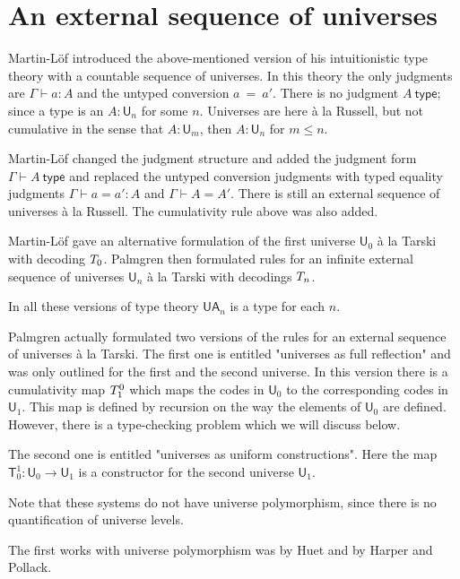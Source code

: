 \documentclass[10pt,a4paper]{article}
\newcommand{\conv}{=}
\def\UU{\mathsf{U}}
\newcommand{\type}{\mathsf{type}}
\newcommand{\T}{\mathsf{T}}
\newcommand{\UA}{\mathsf{UA}}
\begin{document}
\section{An external sequence of universes}

Martin-Löf \cite{martinlof:predicative} introduced the above-mentioned version of his intuitionistic type theory with a countable sequence of universes. In this theory the only judgments are $\Gamma \vdash a : A$ and the untyped conversion $a\ \conv\ a'$. There is no judgment $A\ \type$; since a type is an $A : \UU_n$ for some $n$. Universes are here \`a la Russell, but not cumulative in the sense that $A : \UU_m$, then $A : \UU_n$ for $m \leq n$.

Martin-Löf \cite{martinlof:hannover} changed the judgment structure and added the judgment form $\Gamma \vdash A\ \type$ and replaced the untyped conversion judgments with typed equality judgments $\Gamma \vdash a = a' : A$ and $\Gamma \vdash A = A'$. There is still an external sequence of universes \`a la Russell. The cumulativity rule above was also added.

Martin-Löf \cite{martinlof:bibliopolis} gave an alternative formulation of the first universe $\UU_0$ \`a la Tarski with decoding $\\T_0$.
Palmgren \cite{palmgren:phd} then formulated rules for an infinite external sequence of universes $\UU_n$ \`a la Tarski with decodings $\\T_n$.

In all these versions of type theory $\UA_n$ is a type for each $n$.

Palmgren actually formulated two versions of the rules for an external sequence of universes \`a la Tarski. The first one is entitled "universes as full reflection" and was only outlined for the first and the second universe. In this version there is a cumulativity map $\\T_1^0$ which maps the codes in $\UU_0$ to the corresponding codes in $\UU_1$. This map is defined by recursion on the way the elements of $\UU_0$ are defined. However, there is a type-checking problem which we will discuss below.

The second one is entitled "universes as uniform constructions". Here the map $\T_0^1 : \UU_0 \to \UU_1$ is a constructor for the second universe $\UU_1$. 

Note that these systems do not have universe polymorphism, since there is no quantification of universe levels.

The first works with universe polymorphism was by Huet and by Harper and Pollack.
\end{document}
